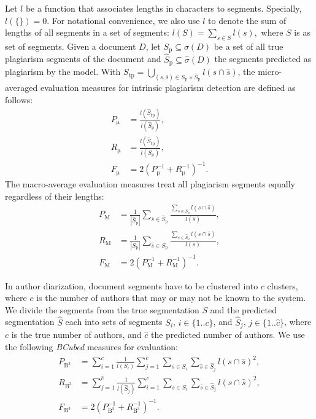 \documentclass[10pt, a4paper]{article}
\begin{document}
Let $l$ be a function that associates lengths in characters to segments. Specially, $l(\{\}) = 0$. For notational convenience, we also use $l$ to denote the sum of lengths of all segments in a set of segments: $l(S) = \sum_{s\in S} l(s),$ where $S$ is as set of segments. Given a document $D$, let $S_\mathrm{p} \subseteq \sigma(D)$ be a set of all true plagiarism segments of the document and $\hat{S}_\mathrm{p} \subseteq \hat{\sigma}(D)$ the segments predicted as plagiarism by the  model. With ${S_\mathrm{tp} = \bigcup_{(s,\hat{s})\in S_\mathrm{p}\times\hat{S}_\mathrm{p}} l(s\cap\hat{s})}$, the micro-averaged evaluation measures for intrinsic plagiarism detection are defined as follows:
\begin{align}
P_\mathrm{\mu} &= \frac{l(\hat{S}_\mathrm{tp})}{l(\hat{S}_\mathrm{p})}, \\
R_\mathrm{\mu} &= \frac{l(\hat{S}_\mathrm{tp})}{l(S_\mathrm{p})}, \\
F_\mathrm{\mu} &= 2(P_\mathrm{\mu}^{-1}+R_\mathrm{\mu}^{-1})^{-1}.
\end{align}
The macro-average evaluation measures treat all plagiarism segments equally regardless of their lengths:
\begin{align}
P_\mathrm{M} &= \frac{1}{|\hat{S}_\mathrm{p}|}
	\sum_{\hat{s}\in\hat{S}_\mathrm{p}}
		\frac{{\sum_{s\in S_\mathrm{p}} l(s\cap\hat{s})}}{l(\hat{s})}, \\
R_\mathrm{M} &= \frac{1}{|S_\mathrm{p}|}
	\sum_{\hat{s}\in S_\mathrm{p}}
		\frac{{\sum_{s\in \hat{S}_\mathrm{p}} l(s\cap\hat{s})}}{l(s)}, \\
F_\mathrm{M} &= 2(P_\mathrm{M}^{-1}+R_\mathrm{M}^{-1})^{-1}.
\end{align}

In author diarization, document segments have to be clustered into $c$ clusters, where $c$ is the number of authors that may or may not be known to the system. We divide the segments from the true segmentation $S$ and the predicted segmentation $\hat{S}$ each into sets of segments $S_i$, $i\in\{1..c\}$, and $\hat{S}_j$, $j\in\{1..\hat{c}\}$, where $c$ is the true number of authors, and $\hat{c}$ the predicted number of authors. We use the following \emph{BCubed} measures for evaluation:
\begin{align}
P_{\mathrm{B}^3} &= \sum_{i=1}^c \frac{1}{l(S_i)}\sum_{j=1}^{\hat{c}}
	\sum_{s\in S_i}	\sum_{\hat{s}\in\hat{S}_j} l(s\cap \hat{s})^2, \\
R_{\mathrm{B}^3} &= \sum_{j=1}^{\hat{c}} \frac{1}{l(\hat{S}_j)}\sum_{i=1}^{c}
	\sum_{s\in S_i}	\sum_{\hat{s}\in\hat{S}_j} l(s\cap \hat{s})^2, \\
F_{\mathrm{B}^3} &= 2(P_{\mathrm{B}^3}^{-1}+R_{\mathrm{B}^3}^{-1})^{-1}.
\end{align}
\end{document}
